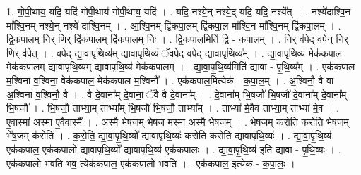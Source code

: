 \documentclass[17pt]{extarticle}
\begin{document}
1. गो॒पी॒थाय॒ यदि॒ यदि॑ गोपी॒थाय॑ गोपी॒थाय॒ यदि॑ । . यदि॒ नश्ये॒न् नश्ये॒द् यदि॒ यदि॒ नश्ये᳚त् । . नश्ये॑दाश्वि॒न मा᳚श्वि॒नम् नश्ये॒न् नश्ये॑ दाश्वि॒नम् । . आ॒श्वि॒नम् द्वि॑कपा॒लम् द्वि॑कपा॒ल मा᳚श्वि॒न मा᳚श्वि॒नम् द्वि॑कपा॒लम् । . द्वि॒क॒पा॒लम् निर् णिर् द्वि॑कपा॒लम् द्वि॑कपा॒लम् निः । . द्वि॒क॒पा॒लमिति॑ द्वि - क॒पा॒लम् । . निर् व॑पेद् वपे॒न् निर् णिर् व॑पेत् । . व॒पे॒द् द्या॒वा॒पृ॒थि॒व्य॑म् द्यावापृथि॒व्यं॑ ॅवपेद् वपेद् द्यावापृथि॒व्य᳚म् । . द्या॒वा॒पृ॒थि॒व्य॑ मेक॑कपाल॒ मेक॑कपालम् द्यावापृथि॒व्य॑म् द्यावापृथि॒व्य॑ मेक॑कपालम् । . द्या॒वा॒पृ॒थि॒व्य॑मिति॑ द्यावा - पृ॒थि॒व्य᳚म् । . एक॑कपाल म॒श्विना॑ व॒श्विना॒ वेक॑कपाल॒ मेक॑कपाल म॒श्विनौ᳚ । . एक॑कपाल॒मित्येक॑ - क॒पा॒ल॒म् । . अ॒श्विनौ॒ वै वा अ॒श्विना॑ व॒श्विनौ॒ वै । . वै दे॒वाना᳚म् दे॒वानां॒ ॅवै वै दे॒वाना᳚म् । . दे॒वाना᳚म् भि॒षजौ॑ भि॒षजौ॑ दे॒वाना᳚म् दे॒वाना᳚म् भि॒षजौ᳚ । . भि॒षजौ॒ ताभ्या॒म् ताभ्या᳚म् भि॒षजौ॑ भि॒षजौ॒ ताभ्या᳚म् । . ताभ्या॑ मे॒वैव ताभ्या॒म् ताभ्या॑ मे॒व । . ए॒वास्मा॑ अस्मा ए॒वैवास्मै᳚ । . अ॒स्मै॒ भे॒ष॒जम् भे॑ष॒ज म॑स्मा अस्मै भेष॒जम् । . भे॒ष॒जम् क॑रोति करोति भेष॒जम् भे॑ष॒जम् क॑रोति । . क॒रो॒ति॒ द्या॒वा॒पृ॒थि॒व्यो᳚ द्यावापृथि॒व्यः॑ करोति करोति द्यावापृथि॒व्यः॑ । . द्या॒वा॒पृ॒थि॒व्य॑ एक॑कपाल॒ एक॑कपालो द्यावापृथि॒व्यो᳚ द्यावापृथि॒व्य॑ एक॑कपालः । . द्या॒वा॒पृ॒थि॒व्य॑ इति॑ द्यावा - पृ॒थि॒व्यः॑ । . एक॑कपालो भवति भव॒ त्येक॑कपाल॒ एक॑कपालो भवति । . एक॑कपाल॒ इत्येक॑ - क॒पा॒लः॒ । \newline
\end{document}
